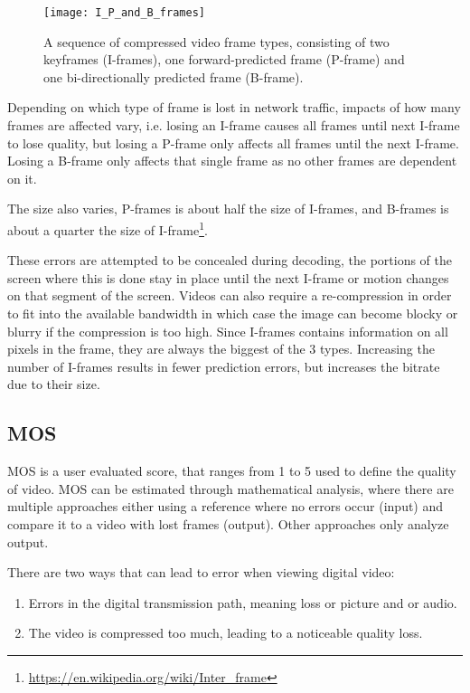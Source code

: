 \begin{figure}
    \myfloatalign
    \texttt{[image: I\_P\_and\_B\_frames]}
    \caption{A sequence of compressed video frame types, consisting of two keyframes (\acsp{I-frame}), one forward-predicted frame (\acs{P-frame}) and one bi-directionally predicted frame (\acs{B-frame}).}
    \label{fig:video_compression_frames}
\end{figure}

Depending on which type of frame is lost in network traffic, impacts of how many frames are affected vary, i.e. losing an \ac{I-frame} causes all frames until next \ac{I-frame} to lose quality, but losing a \ac{P-frame} only affects all frames until the next \ac{I-frame}. Losing a \ac{B-frame} only affects that single frame as no other frames are dependent on it.

The size also varies, \acp{P-frame} is about half the size of \acp{I-frame}, and \acp{B-frame} is about a quarter the size of \ac{I-frame}\footnote{\url{https://en.wikipedia.org/wiki/Inter_frame}}.

These errors are attempted to be concealed during decoding, the portions of the screen where this is done stay in place until the next \ac{I-frame} or motion changes on that segment of the screen. Videos can also require a re-compression in order to fit into the available bandwidth in which case the image can become blocky or blurry if the compression is too high.
Since \acp{I-frame} contains information on all pixels in the frame, they are always the biggest of the 3 types. Increasing the number of \acp{I-frame} results in fewer prediction errors, but increases the bitrate due to their size.


\subsection{\acl{MOS}}
\ac{MOS} is a user evaluated score, that ranges from 1 to 5 used to define the quality of video. \ac{MOS} can be estimated through mathematical analysis, where there are multiple approaches either using a reference where no errors occur (input) and compare it to a video with lost frames (output). Other approaches only analyze output.


There are two ways that can lead to error when viewing digital video:
\begin{enumerate}
    \item Errors in the digital transmission path, meaning loss or picture and or audio.
    \item The video is compressed too much, leading to a noticeable quality loss.
\end{enumerate}


